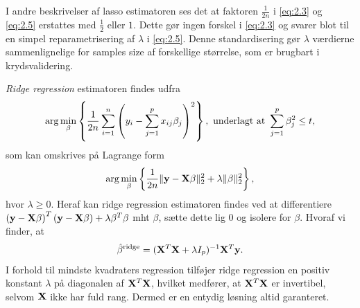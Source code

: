 I andre beskrivelser af lasso estimatoren ses det at faktoren \(\frac{1}{2n}\) i \eqref{eq:2.3} og \eqref{eq:2.5} erstattes med \(\frac{1}{2}\) eller \(1\).
Dette gør ingen forskel i \eqref{eq:2.3} og svarer blot til en simpel reparametrisering af \(\lambda\) i \eqref{eq:2.5}.
Denne standardisering gør \(\lambda\) værdierne sammenlignelige for samples size af forskellige størrelse, som er brugbart i krydsvalidering.

\textit{Ridge regression} estimatoren findes udfra 
\begin{align} 
\arg \min_{\beta} \cbr{\frac{1}{2n} \sum_{i=1}^n \del{y_i - \sum_{j=1}^p x_{ij} \beta_j}^2}, \ \text{underlagt at } \sum_{j=1}^p \beta_j^2 \leq t, \label{eq:2.7} 
\end{align} 
som kan omskrives på Lagrange form
\begin{align*}
\arg \min_{\beta} \cbr{\frac{1}{2n} \Vert \y - \X \beta \Vert_2^2 + \lambda \Vert \beta \Vert_2^2},
\end{align*}
hvor $\lambda \geq 0$.
Heraf kan ridge regression estimatoren findes ved at differentiere \(\del{\y - \X \beta}^T \del{\y - \X \beta} + \lambda \beta^T \beta\) mht $\beta$, sætte dette lig 0 og isolere for $\beta$. Hvoraf vi finder, at
\begin{align*} 
\hat{\beta}^\text{ridge} = (\mathbf{X}^T \mathbf{X} + \lambda I_p)^{-1} \mathbf{X}^T \mathbf{y}. 
\end{align*}  
I forhold til mindste kvadraters regression tilføjer ridge regression en positiv konstant $\lambda$ på diagonalen af $\mathbf{X}^T \mathbf{X}$, hvilket medfører, at \(\mathbf{X}^T \mathbf{X}\) er invertibel, selvom $\mathbf{X}$ ikke har fuld rang. 
Dermed er en entydig løsning altid garanteret. 

